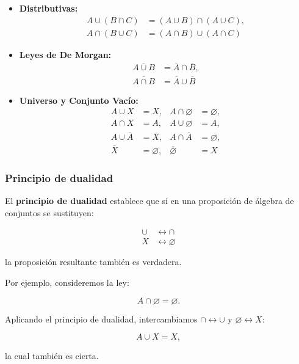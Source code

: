 \documentclass[a4paper,12pt]{article}
\begin{document}
\begin{procedimiento}[title=Lista de Leyes]
\begin{itemize}
    \item \textbf{Distributivas:}
    \[
    \begin{aligned}
    A \cup (B \cap C) &= (A \cup B) \cap (A \cup C),\\
    A \cap (B \cup C) &= (A \cap B) \cup (A \cap C)
    \end{aligned}
    \]
    
    \item \textbf{Leyes de De Morgan:}
    \[
    \begin{aligned}
    \overline{A \cup B} &= \overline{A} \cap \overline{B},\\
    \overline{A \cap B} &= \overline{A} \cup \overline{B}
    \end{aligned}
    \]
    
    \item \textbf{Universo y Conjunto Vacío:}
    \[
    \begin{aligned}
    A \cup X &= X, & A \cap \varnothing &= \varnothing,\\
    A \cap X &= A, & A \cup \varnothing &= A,\\
    A \cup \overline{A} &= X, & A \cap \overline{A} &= \varnothing,\\
    \overline{X} &= \varnothing, & \overline{\varnothing} &= X
    \end{aligned}
    \]
\end{itemize}

\end{procedimiento}

\subsubsection{Principio de dualidad}

\begin{procedimiento}[title=Principio de Dualidad]
El \textbf{principio de dualidad} establece que si en una proposición de álgebra de conjuntos se sustituyen:

\[
\begin{aligned}
\cup &\longleftrightarrow \cap \\
X   &\longleftrightarrow \varnothing
\end{aligned}
\]

la proposición resultante también es verdadera.
\end{procedimiento}
\begin{ejemplo}
Por ejemplo, consideremos la ley:

\[
A \cap \varnothing = \varnothing.
\]

Aplicando el principio de dualidad, intercambiamos \(\cap \leftrightarrow \cup\) y \(\varnothing \leftrightarrow X\):

\[
A \cup X = X,
\]

la cual también es cierta.
\end{ejemplo}
\end{document}
